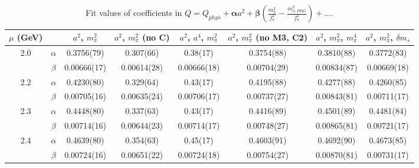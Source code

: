 \documentclass[12pt]{extarticle}
\begin{document}
\begin{table}[h!]
\begin{center}
\begin{tabular}{|c c|c|c|c|c|c|c|}
\hline
$\mu$ (GeV) &  & $a^2$, $m_\pi^2$& $a^2$, $m_\pi^2$ (no C)& $a^2$, $a^4$, $m_\pi^2$& $a^2$, $m_\pi^2$ (no M3, C2)& $a^2$, $m_\pi^2$, $m_\pi^4$& $a^2$, $m_\pi^2$, $\delta m_s$\\
\hline
\multirow{2}{0.5in}{2.0} & $\alpha$ & 0.3756(79)& 0.307(66)& 0.38(17)& 0.3754(88)& 0.3810(88)& 0.3772(83)\\
 & $\beta$ & 0.00666(17)& 0.00614(28)& 0.00666(18)& 0.00704(29)& 0.00834(87)& 0.00669(18)\\
\hline
\multirow{2}{0.5in}{2.2} & $\alpha$ & 0.4230(80)& 0.329(64)& 0.43(17)& 0.4195(88)& 0.4277(88)& 0.4260(85)\\
 & $\beta$ & 0.00705(16)& 0.00635(24)& 0.00706(17)& 0.00737(27)& 0.00843(81)& 0.00711(17)\\
\hline
\multirow{2}{0.5in}{2.3} & $\alpha$ & 0.4448(80)& 0.337(63)& 0.43(17)& 0.4416(89)& 0.4501(89)& 0.4481(84)\\
 & $\beta$ & 0.00714(16)& 0.00644(23)& 0.00714(17)& 0.00748(27)& 0.00865(81)& 0.00721(17)\\
\hline
\multirow{2}{0.5in}{2.4} & $\alpha$ & 0.4639(80)& 0.354(63)& 0.45(17)& 0.4603(91)& 0.4692(90)& 0.4673(85)\\
 & $\beta$ & 0.00724(16)& 0.00651(22)& 0.00724(18)& 0.00754(27)& 0.00870(81)& 0.00731(17)\\
\hline
\end{tabular}
\caption{Fit values of coefficients in $Q = Q_{phys} + \mathbf{\alpha} a^2 + \mathbf{\beta}\left(\frac{m_\pi^2}{f_\pi^2}-\frac{m_{\pi,PDG}^2}{f_\pi^2}\right) + \ldots$.}
\end{center}
\end{table}
























\clearpage
\end{document}
